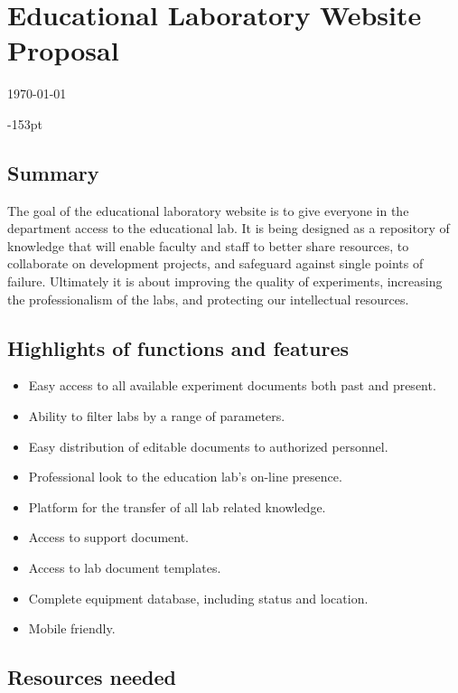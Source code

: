 



\chapter{\bf Educational Laboratory Website Proposal}
\vspace{-1.5cm}
\today
\begin{adjustwidth}{}{-153pt}

\section{\bf Summary}
The goal of the educational laboratory website is to give everyone in the department access to the educational lab. It is being designed as a repository of knowledge that will enable faculty and staff to better share resources, to collaborate on development projects, and safeguard against single points of failure. Ultimately it is about improving the quality of experiments, increasing the professionalism of the labs, and protecting our intellectual resources. \\


\section{\bf Highlights of functions and features}

\begin{itemize}
\item Easy access to all available experiment documents both past and present.
\item Ability to filter labs by a range of parameters.
\item Easy distribution of editable documents to authorized personnel.
\item Professional look to the education lab's on-line presence.
\item Platform for the transfer of all lab related knowledge.
\item Access to support document.
\item Access to lab document templates.
\item Complete equipment database, including status and location.
\item Mobile friendly.
\end{itemize}


\section{\bf Resources needed}


\end{adjustwidth}
